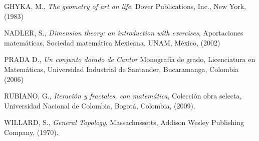 \begin{titlepage}
\begin{thebibliography}{99}
 GHYKA, M., \textit{The geometry of art an life},
Dover Publications, Inc., New York, (1983)

 NADLER, S., \textit{Dimension theory: an introduction with exercises},
Aportaciones matem\'aticas, Sociedad matem\'atica Mexicana, UNAM,
M\'exico, (2002)

 PRADA D., \textit{Un conjunto dorado de Cantor}
Monograf\'ia de grado, Licenciatura en Matem\'aticas, Universidad
Industrial de Santander, Bucaramanga, Colombia (2006)

 RUBIANO, G., \textit{Iteraci\'on y fractales, con matem\'atica},
Colecci\'on obra selecta, Universidad Nacional de Colombia, Bogot\'a,
Colombia, (2009).

 WILLARD, S., \textit{General Topology},
Massachussetts, Addison Wesley Publishing Company, (1970).
\end{thebibliography}
\end{titlepage}
